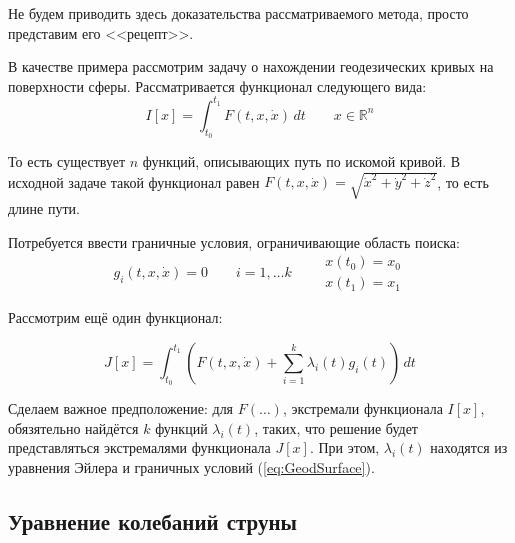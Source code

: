 \documentclass[12pt]{article}
\begin{document}
		Не будем приводить здесь доказательства рассматриваемого метода, просто представим его <<рецепт>>.

		В качестве примера рассмотрим задачу о нахождении геодезических кривых на поверхности сферы.
		Рассматривается функционал следующего вида:
		$$I[x] = \int_{t_0}^{t_1} F(t,x,\dot{x})\,dt \qquad x \in \mathbb{R}^n$$

		То есть существует $n$ функций, описывающих путь по искомой кривой. В исходной задаче такой
		функционал равен $F(t,x,\dot{x}) = \sqrt{\dot{x}^2 + \dot{y}^2 + \dot{z}^2}$, то есть длине
		пути.

		Потребуется ввести граничные условия, ограничивающие область поиска:
		\begin{equation} \label{eq:GeodSurface}
			g_i(t, x, \dot{x}) = 0 \qquad i = 1,\ldots k \qquad
			\begin{aligned}
				x(t_0) = x_0 \\
				x(t_1) = x_1
			\end{aligned}
		\end{equation}

		Рассмотрим ещё один функционал:

		$$J[x] = \int_{t_0}^{t_1} \left(F(t,x,\dot{x}) + \sum_{i=1}^k \lambda_i(t) g_i(t)\right)\,dt$$

		Сделаем важное предположение: для $F(\ldots)$, экстремали функционала $I[x]$, обязятельно найдётся
		$k$ функций $\lambda_i(t)$, таких, что решение будет представляться экстремалями функционала $J[x]$.
		При этом, $\lambda_i(t)$ находятся из уравнения Эйлера и граничных условий (\ref{eq:GeodSurface}).

	\subsection{Уравнение колебаний струны}

\end{document}
